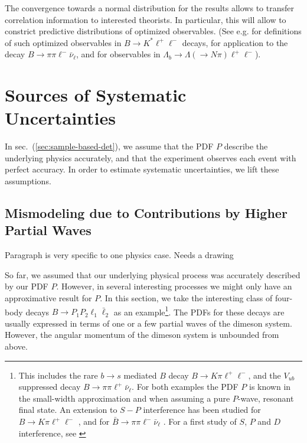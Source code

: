 \documentclass[aps,prd,reprint,nofootinbib,preprintnumbers]{revtex4}
\newcommand{\refsec}[1]{sec.~(\ref{sec:#1})}
\newcommand{\fred}[1]{{\color{brown!85!black}#1}}
\begin{document}
The convergence towards a normal distribution for the results allows to transfer correlation information to interested
theorists. In particular, this will allow to constrict predictive distributions of optimized observables.
(See e.g. \cite{Egede:2008uy,Egede:2010zc,Bobeth:2010wg,Becirevic:2011bp,Bobeth:2012vn,Matias:2012xw,DescotesGenon:2012zf}
for definitions of such optimized observables in $B\to K^*\ell^+\ell^-$ decays, \cite{Faller:2013dwa} for application to
the decay $B\to \pi\pi\ell^-\bar\nu_\ell$, and \cite{Boeer:2014xx} for observables in $\Lambda_b\to\Lambda(\to N\pi)\ell^+\ell^-$).



\section{Sources of Systematic Uncertainties}
\label{sec:systematics}

In \refsec{sample-based-det}, we assume that the PDF $P$ describe the underlying physics accurately,
and that the experiment observes each event with perfect accuracy. In order to estimate systematic
uncertainties, we lift these assumptions.

\subsection{Mismodeling due to Contributions by Higher Partial Waves}
\label{sec:systematics:partial-waves}

\fred{Paragraph is very specific to one physics case. Needs a drawing}

So far, we assumed that our underlying physical process was accurately described by our PDF $P$.
However, in several interesting processes we might only have an approximative result for $P$.
In this section, we take the interesting class of four-body decays $B\to P_1 P_2 \ell_1 \bar\ell_2$
as an example\footnote{This includes the rare $b\to s$ mediated $B$ decay $B \to K\pi\ell^+\ell^-$, and
the $V_{ub}$ suppressed decay $B\to \pi\pi\ell^+\bar\nu_\ell$. For both examples the PDF $P$ is known in
the small-width approximation and when assuming a pure $P$-wave, resonant final state. An extension to
$S-P$ interference has been studied for $B\to K\pi\ell^+\ell^-$ \cite{Blake:2012mb,Becirevic:2011bp},
and for $\bar{B}\to \pi\pi\ell^-\bar\nu_\ell$ \cite{Faller:2013dwa}. For a first study of $S$, $P$
and $D$ interference, see \cite{Das:2014sra}}.%
The PDFs for these decays are usually expressed in terms of one or a few partial waves
of the dimeson system. However, the angular momentum of the dimeson system is unbounded from above.
\\
\end{document}
